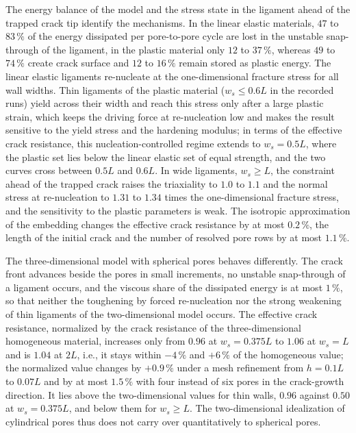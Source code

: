 \documentclass[pdflatex,sn-mathphys-num]{sn-jnl}%
\theoremstyle{thmstyleone}%
\theoremstyle{thmstyletwo}%
\theoremstyle{thmstylethree}%
\begin{document}
The energy balance of the model and the stress state in the ligament ahead of the trapped crack tip identify the mechanisms. In the linear elastic materials, $47$ to $83\,\%$ of the energy dissipated per pore-to-pore cycle are lost in the unstable snap-through of the ligament, in the plastic material only $12$ to $37\,\%$, whereas $49$ to $74\,\%$ create crack surface and $12$ to $16\,\%$ remain stored as plastic energy. The linear elastic ligaments re-nucleate at the one-dimensional fracture stress for all wall widths. Thin ligaments of the plastic material ($w_s \le 0.6L$ in the recorded runs) yield across their width and reach this stress only after a large plastic strain, which keeps the driving force at re-nucleation low and makes the result sensitive to the yield stress and the hardening modulus; in terms of the effective crack resistance, this nucleation-controlled regime extends to $w_s = 0.5L$, where the plastic set lies below the linear elastic set of equal strength, and the two curves cross between $0.5L$ and $0.6L$. In wide ligaments, $w_s \ge L$, the constraint ahead of the trapped crack raises the triaxiality to $1.0$ to $1.1$ and the normal stress at re-nucleation to $1.31$ to $1.34$ times the one-dimensional fracture stress, and the sensitivity to the plastic parameters is weak. The isotropic approximation of the embedding changes the effective crack resistance by at most $0.2\,\%$, the length of the initial crack and the number of resolved pore rows by at most $1.1\,\%$.

The three-dimensional model with spherical pores behaves differently. The crack front advances beside the pores in small increments, no unstable snap-through of a ligament occurs, and the viscous share of the dissipated energy is at most $1\,\%$, so that neither the toughening by forced re-nucleation nor the strong weakening of thin ligaments of the two-dimensional model occurs. The effective crack resistance, normalized by the crack resistance of the three-dimensional homogeneous material, increases only from $0.96$ at $w_s = 0.375L$ to $1.06$ at $w_s = L$ and is $1.04$ at $2L$, i.e., it stays within $-4\,\%$ and $+6\,\%$ of the homogeneous value; the normalized value changes by $+0.9\,\%$ under a mesh refinement from $h = 0.1L$ to $0.07L$ and by at most $1.5\,\%$ with four instead of six pores in the crack-growth direction. It lies above the two-dimensional values for thin walls, $0.96$ against $0.50$ at $w_s = 0.375L$, and below them for $w_s \ge L$. The two-dimensional idealization of cylindrical pores thus does not carry over quantitatively to spherical pores.
\end{document}

